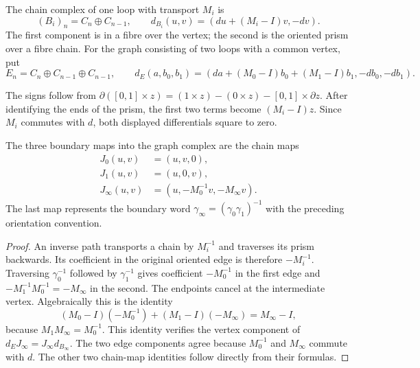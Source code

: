 \begin{definition}\label{ntg:def:prism}
The chain complex of one loop with transport $M_i$ is
\[
 (B_i)_n=C_n\oplus C_{n-1},\qquad
 d_{B_i}(u,v)=(du+(M_i-I)v,-dv).
\]
The first component is in a fibre over the vertex; the second is the
oriented prism over a fibre chain. For the graph consisting of two
loops with a common vertex, put
\begin{equation}\label{ntg:eq:graph}
 E_n=C_n\oplus C_{n-1}\oplus C_{n-1},\qquad
 d_E(a,b_0,b_1)=(da+(M_0-I)b_0+(M_1-I)b_1,-db_0,-db_1).
\end{equation}
\end{definition}

The signs follow from
$\partial([0,1]\times z)=(1\times z)-(0\times z)-[0,1]\times\partial z$.
After identifying the ends of the prism, the first two terms become
$(M_i-I)z$. Since $M_i$ commutes with $d$, both displayed
differentials square to zero.

\begin{lemma}\label{ntg:lem:boundary-word}
The three boundary maps into the graph complex are the chain maps
\begin{equation}\label{ntg:eq:boundary-word}
 \begin{split}
 J_0(u,v)&=(u,v,0),\\
 J_1(u,v)&=(u,0,v),\\
 J_\infty(u,v)&=(u,-M_0^{-1}v,-M_\infty v).
 \end{split}
\end{equation}
The last map represents the boundary word
$\gamma_\infty=(\gamma_0\gamma_1)^{-1}$ with the preceding
orientation convention.
\end{lemma}
\begin{proof}
An inverse path transports a chain by $M_i^{-1}$ and traverses its
prism backwards. Its coefficient in the original oriented edge is
therefore $-M_i^{-1}$. Traversing $\gamma_0^{-1}$ followed by
$\gamma_1^{-1}$ gives coefficient $-M_0^{-1}$ in the first edge and
$-M_1^{-1}M_0^{-1}=-M_\infty$ in the second. The endpoints cancel
at the intermediate vertex. Algebraically this is the identity
\begin{equation}\label{ntg:eq:word-identity}
 (M_0-I)(-M_0^{-1})+(M_1-I)(-M_\infty)=M_\infty-I,
\end{equation}
because $M_1M_\infty=M_0^{-1}$. This identity verifies the vertex
component of $d_EJ_\infty=J_\infty d_{B_\infty}$. The two edge
components agree because $M_0^{-1}$ and $M_\infty$ commute with $d$.
The other two chain-map identities follow directly from their formulas.
\end{proof}


